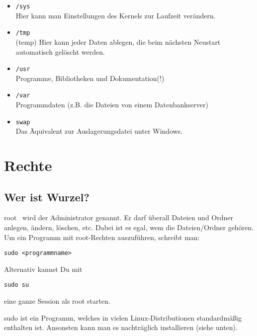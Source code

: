 \documentclass[a4paper,10pt]{article}
\begin{document}
\begin{itemize}
\item \texttt{/sys} \\ Hier kann man Einstellungen des Kernels zur Laufzeit verändern.
\item \texttt{/tmp} \\ (temp) Hier kann jeder Daten ablegen, die beim nächsten Neustart automatisch gelöscht werden.
\item \texttt{/usr} \\ Programme, Bibliotheken und Dokumentation(!)
\item \texttt{/var} \\ Programmdaten (z.B. die Dateien von einem Datenbankserver)
\item \texttt{swap} \\ Das Äquivalent zur Auslagerungsdatei unter Windows.
\end{itemize}


\section{ Rechte}
\subsection{Wer ist Wurzel?}
\glqq root \grqq ~wird der Administrator genannt. Er darf überall Dateien 
und Ordner anlegen, ändern, löschen, etc. Dabei ist es egal, wem die 
Dateien/Ordner gehören. Um ein Programm mit root-Rechten auszuführen, 
schreibt man:
\begin{lstlisting}
sudo <programmname>
\end{lstlisting} 
Alternativ kannst Du mit
\begin{lstlisting}
sudo su
\end{lstlisting} 
eine ganze Session als root starten.

sudo ist ein Programm, welches in vielen Linux-Distributionen standardmäßig
enthalten ist. Ansonsten kann man es nachträglich installieren (siehe unten).
\pagebreak
\end{document}
